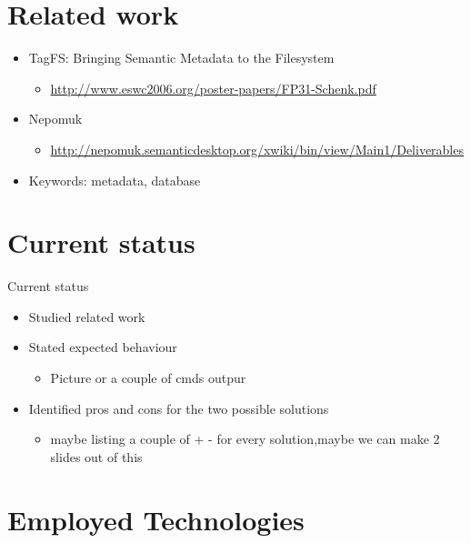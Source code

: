 \documentclass{beamer}
\begin{document}
\section{Related work}

\begin{frame}
  
  \begin{itemize}
  \item TagFS: Bringing Semantic Metadata to the Filesystem
    \begin{itemize}
    \item \url{http://www.eswc2006.org/poster-papers/FP31-Schenk.pdf}
    \end{itemize}
    
  \item Nepomuk
    \begin{itemize}
    \item \url{http://nepomuk.semanticdesktop.org/xwiki/bin/view/Main1/Deliverables}
    \end{itemize}
    
  \item Keywords: metadata, database
  \end{itemize}
  
\end{frame}

\section{Current status}

\begin{frame}{Current status}
  \begin{itemize}
  \item Studied related work
  \item Stated expected behaviour
    \begin{itemize}
    \item Picture or a couple of cmds outpur
    \end{itemize}
  \item Identified pros and cons for the two possible solutions
    \begin{itemize}
    \item maybe listing a couple of + - for every solution,maybe we
      can make 2 slides out of this
    \end{itemize}
  \end{itemize}
\end{frame}

\section{Employed Technologies}
\end{document}
